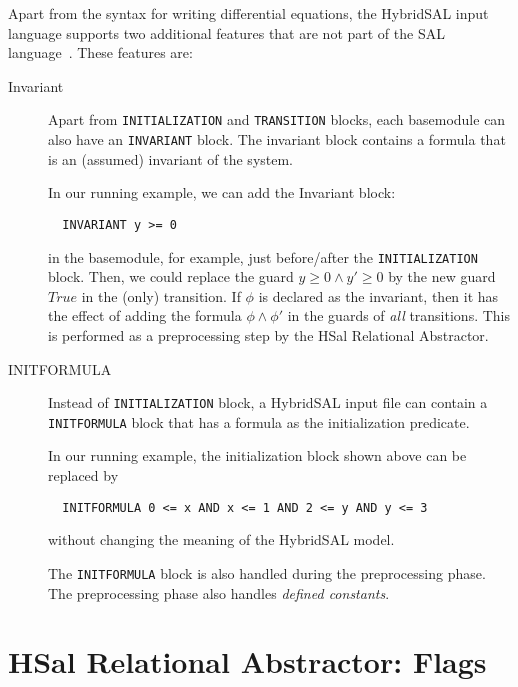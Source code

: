 \documentclass{article}
\begin{document}
Apart from the syntax for writing differential equations,
the HybridSAL input language supports two additional features
that are not part of the SAL language~\cite{SAL-language}.
These features are:
\begin{description}
\item[Invariant]
 Apart from {\tt{INITIALIZATION}} and {\tt{TRANSITION}} blocks,
 each basemodule can also have an {\tt{INVARIANT}} block.
 The invariant block contains a formula that is an (assumed)
 invariant of the system.
 
 In our running example, we can add the Invariant block:
 \begin{tt}
 \begin{verbatim}
  INVARIANT y >= 0
 \end{verbatim}
 \end{tt}
 in the basemodule, for example, just before/after the 
 {\tt{INITIALIZATION}} block.
 Then, we could replace the guard
 $y \geq 0 \wedge y'\geq 0$ by the new guard $\mathit{True}$
 in the (only) transition.
 If $\phi$ is declared as the invariant, then it has the
 effect of adding the formula $\phi \wedge \phi'$ in the guards
 of {\em{all}} transitions.  This is performed as a preprocessing
 step by the HSal Relational Abstractor.

\item[INITFORMULA]
 Instead of {\tt{INITIALIZATION}} block, a HybridSAL input file
 can contain a {\tt{INITFORMULA}} block that has a formula
 as the initialization predicate.
 
 In our running example, the initialization block shown above
 can be replaced by
 \begin{tt}
 \begin{verbatim}
  INITFORMULA 0 <= x AND x <= 1 AND 2 <= y AND y <= 3
 \end{verbatim}
 \end{tt}
 without changing the meaning of the HybridSAL model.

 The {\tt{INITFORMULA}} block is also handled during the
 preprocessing phase.
 The preprocessing phase also handles {\em{defined constants}}.
\end{description}

\section{HSal Relational Abstractor: Flags}
\end{document}
